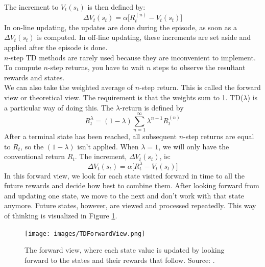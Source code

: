 \documentclass[a4paper]{article}
\begin{document}
The increment to $V_t(s_t)$ is then defined by:
\begin{equation}
\Delta V_t(s_t) = \alpha \big[ R_t^{(n)} - V_t(s_t) \big]
\end{equation}
In on-line updating, the updates are done during the episode, as soon as a $\Delta V_t(s_t)$ is computed. In off-line updating, these increments are set aside and applied after the episode is done.\\
$n$-step TD methods are rarely used because they are inconvenient to implement. To compute $n$-step returns, you have to wait $n$ steps to observe the resultant rewards and states.\\

We can also take the weighted average of $n$-step return. This is called the forward view or theoretical view. The requirement is that the weights sum to 1. TD($\lambda$) is a particular way of doing this. The $\lambda$-return is defined by
\begin{equation}
R^\lambda_t = (1-\lambda) \sum_{n=1}^{\infty} \lambda^{n-1} R_t^{(n)}
\end{equation}
After a terminal state has been reached, all subsequent $n$-step returns are equal to $R_t$, so the $(1-\lambda)$ isn't applied. When $\lambda=1$, we will only have the conventional return $R_t$. The increment, $\Delta V_t(s_t)$, is:
\begin{equation}
\Delta V_t(s_t) = \alpha \big[ R_t^{\lambda} - V_t(s_t) \big]
\end{equation}
In this forward view, we look for each state visited forward in time to all the future rewards and decide how best to combine them. After looking forward from and updating one state, we move to the next and don't work with that state anymore. Future states, however, are viewed and processed repeatedly. This way of thinking is visualized in Figure \ref{fig:TDForwardView}.
\begin{figure}[H]
\texttt{[image: images/TDForwardView.png]}
\caption{The forward view, where each state value is updated by looking forward to the states and their rewards that follow. Source: \cite{Sutton1998ReinforcementIntroductionb}.}
\label{fig:TDForwardView}
\end{figure}
\end{document}
